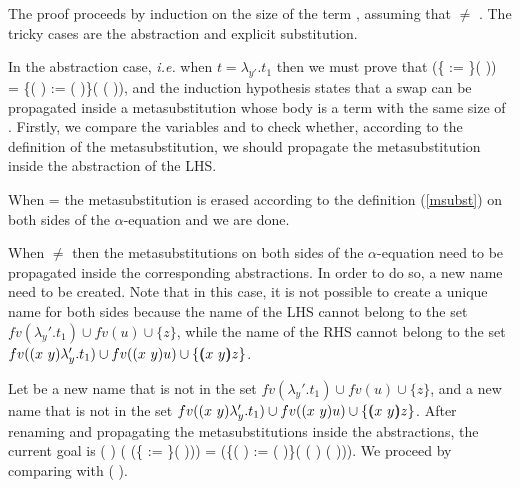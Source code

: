 \begin{coqdoccode}
\end{coqdoccode}
The proof proceeds by induction on the size of the term , assuming that  \ensuremath{\not=} . The tricky cases are the abstraction and explicit substitution. 
\begin{coqdoccode}
\end{coqdoccode}
In the abstraction case, {\it i.e.} when $t = \lambda_{y'}.t_1$ then we must prove that    (\{ := \}(  )) = \{(   ) := (   )\}(   (  )), and the induction hypothesis states that a swap can be propagated inside a metasubstitution whose body is a term with the same size of . Firstly, we compare the variables  and  to check whether, according to the definition of the metasubstitution, we should propagate the metasubstitution inside the abstraction of the LHS. 
\begin{coqdoccode}
\end{coqdoccode}
When  =  the metasubstitution is erased according to the definition (\ref{msubst}) on both sides of the $\alpha$-equation and we are done.
\begin{coqdoccode}
\end{coqdoccode}
When  \ensuremath{\not=}  then the metasubstitutions on both sides of the $\alpha$-equation need to be propagated inside the corresponding abstractions. In order to do so, a new name need to be created. Note that in this case, it is not possible to create a unique name for both sides because the name of the LHS cannot belong to the set $fv(\lambda_y'.t_1) \cup fv(u) \cup \{z\}$, while the name of the RHS cannot belong to the set $fv((x\ y) \lambda_y'.t_1) \cup fv((x\ y) u) \cup \{(\!\!(x\ y)\!\!) z\}$.
\begin{coqdoccode}
\end{coqdoccode}
Let  be a new name that is not in the set $fv(\lambda_y'.t_1) \cup fv(u) \cup \{z\}$, and  a new name that is not in the set $fv((x\ y) \lambda_y'.t_1) \cup fv((x\ y) u) \cup \{(\!\!(x\ y)\!\!) z\}$. After renaming and propagating the metasubstitutions inside the abstractions, the current goal is  (   ) (   (\{ := \}(   ))) =   (\{(   ) := (   )\}( (   )  (   ))). We proceed by comparing  with (   ).
